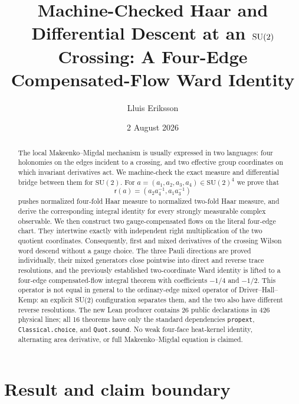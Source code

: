 \documentclass[11pt]{article}
\title{\vspace{-1.5em}\textbf{Machine-Checked Haar and Differential Descent at
an $\SU$ Crossing: A Four-Edge Compensated-Flow Ward Identity}}
\author{Lluis Eriksson}
\date{2 August 2026}
\theoremstyle{definition}
\newcommand{\SU}{\mathrm{SU}(2)}
\newcommand{\red}{\mathsf r}
\begin{document}
\maketitle

\begin{abstract}
The local Makeenko--Migdal mechanism is usually expressed in two languages:
four holonomies on the edges incident to a crossing, and two effective group
coordinates on which invariant derivatives act.  We machine-check the exact
measure and differential bridge between them for $\SU$.  For
$a=(a_1,a_2,a_3,a_4)\in\SU^4$ we prove that
\[
 \red(a)=(a_2a_4^{-1},a_1a_3^{-1})
\]
pushes normalized four-fold Haar measure to normalized two-fold Haar measure,
and derive the corresponding integral identity for every strongly measurable
complex observable.  We then construct two gauge-compensated flows on the
literal four-edge chart.  They intertwine exactly with independent right
multiplication of the two quotient coordinates.  Consequently, first and
mixed derivatives of the crossing Wilson word descend without a gauge choice.
The three Pauli directions are proved individually, their
mixed generators close pointwise into direct and reverse trace resolutions,
and the previously established two-coordinate Ward identity is lifted to a
four-edge compensated-flow integral theorem with coefficients $-1/4$ and
$-1/2$.  This operator is not equal in general to the ordinary-edge mixed
operator of Driver--Hall--Kemp: an explicit SU(2) configuration separates them,
and the two also have different reverse resolutions.  The new Lean
producer contains 26 public declarations in 426 physical lines;
all 16 theorems have only the standard dependencies \texttt{propext},
\texttt{Classical.choice}, and \texttt{Quot.sound}.  No weak four-face
heat-kernel identity, alternating area derivative, or full
Makeenko--Migdal equation is claimed.
\end{abstract}

\section{Result and claim boundary}
\end{document}
